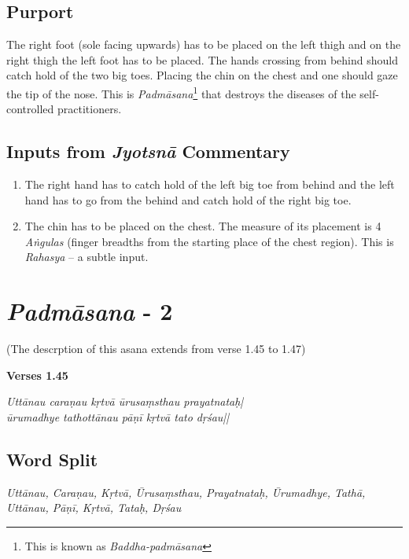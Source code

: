 \subsection*{Purport}


The right foot (sole facing upwards) has to be placed on the left thigh and on the right thigh the left foot has to be placed. The hands crossing from behind should catch hold of the two big toes. Placing the chin on the chest and one should gaze the tip of the nose. This is \textit{Padmāsana}\footnote{This is known as \textit{Baddha-padmāsana}} that destroys the diseases of the self-controlled practitioners.

\subsection*{Inputs from \textit{Jyotsnā} Commentary}


\begin{enumerate}
\item The right hand has to catch hold of the left big toe from behind and the left hand has to go from the behind and catch hold of the right big toe. 
\item The chin has to be placed on the chest. The measure of its placement is 4 \textit{Aṅgulas} (finger breadths from the starting place of the chest region). This is \textit{Rahasya} – a subtle input.  
\end{enumerate}

\section*{\textit{Padmāsana} - 2}

\centerline{(The descrption of this asana extends from verse 1.45 to 1.47)}

\noindent \textbf{Verses 1.45}

\begin{shloka}
\textit{Uttānau caraṇau kṛtvā ūrusaṃsthau prayatnataḥ|\\
ūrumadhye tathottānau pāṇī kṛtvā tato dṛśau||}
\end{shloka}

\subsection*{Word Split}


\textit{Uttānau, Caraṇau, Kṛtvā, Ūrusaṃsthau, Prayatnataḥ, Ūrumadhye, Tathā, Uttānau, Pāṇī, Kṛtvā, Tataḥ, Dṛśau}

